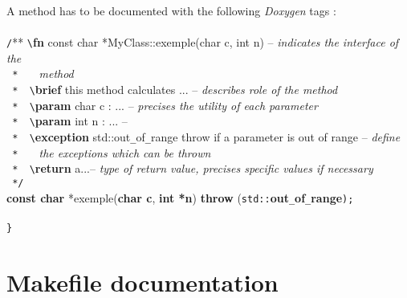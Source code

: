 \documentclass[a4paper,twoside,openright,makeidx,12pt]{report}
\begin{document}
A method has to be documented with the following \textit{Doxygen} tags :\\\\
\verb+/+** \verb+\+\textbf{fn} const char *MyClass::exemple(char c, int n) -- \textit{indicates the interface of the} \\
\verb+ *   +  \textit{method} \\
\verb+ *  \+\textbf{brief} this method calculates ... -- \textit{describes role of the method} \\
\verb+ *  \+\textbf{param} char c : ... -- \textit{precises the utility of each parameter} \\
\verb+ *  \+\textbf{param} int n :  ...  -- \\
\verb+ *  \+\textbf{exception} std::out\verb+_+of\verb+_+range throw if a parameter is out of range -- \textit{define} \\
\verb+ *   +\textit{  the exceptions which can be thrown }\\
\verb+ *  \+\textbf{return} a...-- \textit{type of return value, precises specific values if necessary}\\
\verb+ */ + \\ 
\textbf{const char} *exemple(\textbf{char c}, \textbf{int *n}) \textbf{throw} (\verb+std::+\textbf{out}\verb+_+\textbf{of}\verb+_+\textbf{range}\verb+)+\verb+;+ \\\\
\verb+}+


\section{Makefile documentation}
\end{document}
